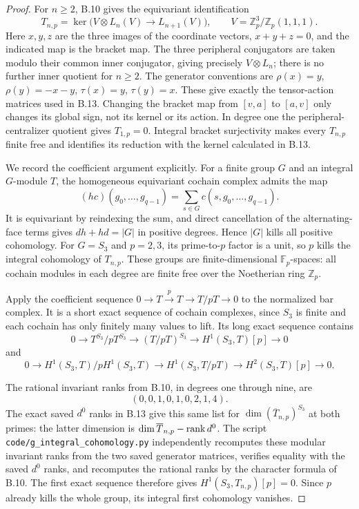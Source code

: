 \begin{proof}
For $n\geq2$, B.10 gives the equivariant identification
\[
 T_{n,p}=\ker\bigl(V\otimes L_n(V)\longrightarrow L_{n+1}(V)\bigr),
 \qquad V=\mathbb Z_p^3/\mathbb Z_p(1,1,1).
\]
Here $x,y,z$ are the three images of the coordinate vectors,
$x+y+z=0$, and the indicated map is the bracket map.
The three peripheral conjugators are taken modulo their
common inner conjugator, giving precisely $V\otimes L_n$;
there is no further inner quotient for $n\geq2$.
The generator conventions are
$\rho(x)=y$, $\rho(y)=-x-y$, $\tau(x)=y$, $\tau(y)=x$.
These give exactly the tensor-action matrices used in B.13.
Changing the bracket map from $[v,a]$ to $[a,v]$ only
changes its global sign, not its kernel or its action.
In degree one the peripheral-centralizer quotient gives
$T_{1,p}=0$. Integral bracket surjectivity makes every
$T_{n,p}$ finite free and identifies its reduction with
the kernel calculated in B.13.

We record the coefficient argument explicitly. For a
finite group $G$ and an integral $G$-module $T$, the
homogeneous equivariant cochain complex admits the map
\[
 (hc)(g_0,\ldots,g_{q-1})
       =\sum_{s\in G}c(s,g_0,\ldots,g_{q-1}).
\]
It is equivariant by reindexing the sum, and direct
cancellation of the alternating-face terms gives
$dh+hd=|G|$ in positive degrees. Hence $|G|$ kills all
positive cohomology. For $G=S_3$ and $p=2,3$, its
prime-to-$p$ factor is a unit, so $p$ kills the integral
cohomology of $T_{n,p}$. These groups are finite-dimensional
$\mathbb F_p$-spaces: all cochain modules in each degree
are finite free over the Noetherian ring $\mathbb Z_p$.

Apply the coefficient sequence
$0\to T\xrightarrow{p}T\to T/pT\to0$ to the normalized
bar complex. It is a short exact sequence of cochain
complexes, since $S_3$ is finite and each cochain has
only finitely many values to lift. Its long exact sequence
contains
\[
 0\longrightarrow T^{S_3}/pT^{S_3}
 \longrightarrow(T/pT)^{S_3}
 \longrightarrow H^1(S_3,T)[p]\longrightarrow0
\]
and
\[
 0\longrightarrow H^1(S_3,T)/pH^1(S_3,T)
 \longrightarrow H^1(S_3,T/pT)
 \longrightarrow H^2(S_3,T)[p]\longrightarrow0.
\]

The rational invariant ranks from B.10, in degrees one
through nine, are
\[
 (0,0,1,0,1,0,2,1,4).
\]
The exact saved $d^0$ ranks in B.13 give this same list for
$\dim(\overline T_{n,p})^{S_3}$ at both primes: the latter
dimension is $\dim\overline T_{n,p}-\operatorname{rank} d^0$.
The script \texttt{code/g\_integral\_cohomology.py}
independently recomputes these modular invariant ranks
from the two saved generator matrices, verifies equality
with the saved $d^0$ ranks, and recomputes the rational
ranks by the character formula of B.10.
The first exact sequence therefore gives
$H^1(S_3,T_{n,p})[p]=0$. Since $p$ already kills the whole
group, its integral first cohomology vanishes.


\end{proof}
